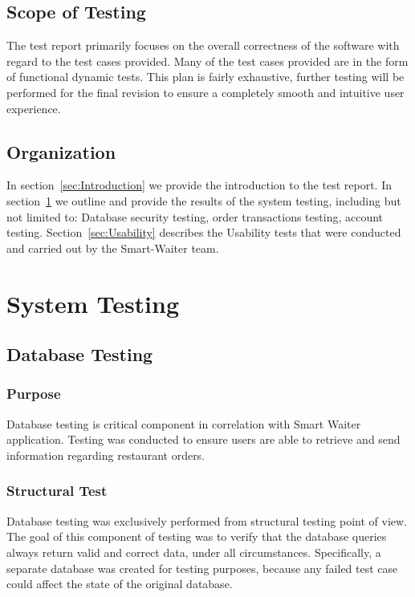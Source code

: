 \documentclass[12pt, titlepage]{article}
\begin{document}
\subsection{Scope of Testing}
The test report primarily focuses on the overall correctness of the software with regard to the test cases provided. Many of the test cases provided are in the form of functional dynamic tests. This plan is fairly exhaustive, further testing will be performed for the final revision to ensure a completely smooth and intuitive user experience.

\subsection{Organization}
In section~\ref{sec:Introduction} we provide the introduction to the test report. In section~\ref{sec:System} we outline and provide the results of the system testing, including but not limited to: Database security testing, order transactions testing, account testing. Section~\ref{sec:Usability} describes the Usability tests that were conducted and carried out by the Smart-Waiter team.
 
\section{System Testing} 
\label{sec:System}

\subsection{Database Testing}

\subsubsection{Purpose}
Database testing is critical component in correlation with Smart Waiter application. Testing was conducted to ensure users are able to retrieve and send information regarding restaurant orders.

\subsubsection{Structural Test}
Database testing was exclusively performed from structural testing point of view. The goal of this component of testing was to verify that the database queries always return valid and correct data, under all circumstances. Specifically, a separate database was created for testing purposes, because any failed test case could affect the state of the original database.\\\\
\end{document}
